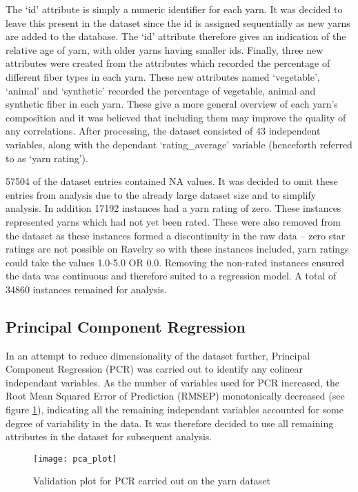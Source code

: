 \documentclass[journal]{IEEEtran}
\begin{document}
The ‘id’ attribute is simply a numeric identifier for each yarn. It was decided to leave this present in the dataset since the id is assigned sequentially as new yarns are added to the database. The ‘id’ attribute therefore gives an indication of the relative age of yarn, with older yarns having smaller ids. Finally, three new attributes were created from the attributes which recorded the percentage of different fiber types in each yarn. These new attributes named ‘vegetable’, ‘animal’ and ‘synthetic’ recorded the percentage of vegetable, animal and synthetic fiber in each yarn.  These give a more general overview of each yarn’s composition and it was believed that including them may improve the quality of any correlations. After processing, the dataset consisted of 43 independent variables, along with the dependant ‘rating\_average’ variable (henceforth referred to as ‘yarn rating’). 

57504 of the dataset entries contained NA values. It was decided to omit these entries from analysis due to the already large dataset size and to simplify analysis. In addition 17192 instances had a yarn rating of zero. These instances represented yarns which had not yet been rated. These were also removed from the dataset as these instances formed a discontinuity in the raw data – zero star ratings are not possible on Ravelry so with these instances included, yarn ratings could take the values 1.0-5.0 OR 0.0. Removing the non-rated instances ensured the data was continuous and therefore suited to a regression model. A total of 34860 instances remained for analysis.

\subsection{Principal Component Regression}
In an attempt to reduce dimensionality of the dataset further, Principal Component Regression (PCR) was carried out to identify any colinear independant variables. As the number of variables used for PCR increased, the Root Mean Squared Error of Prediction (RMSEP) monotonically decreased (see figure \ref{fig:val}), indicating all the remaining independant variables accounted for some degree of variability in the data. It was therefore decided to use all remaining attributes in the dataset for subsequent analysis.

\begin{figure}[h]
\caption{Validation plot for PCR carried out on the yarn dataset}
\centering
\texttt{[image: pca\_plot]}
\label{fig:val}
\end{figure}
\end{document}
